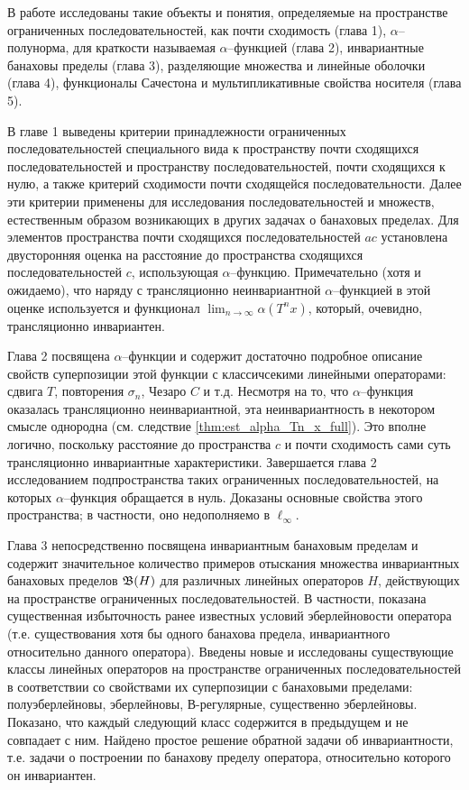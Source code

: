 В работе исследованы такие объекты и понятия, определяемые на пространстве ограниченных последовательностей,
как почти сходимость (глава 1), $\alpha$--полунорма, для краткости называемая $\alpha$--функцией (глава 2),
инвариантные банаховы пределы (глава 3), разделяющие множества и линейные оболочки (глава 4),
функционалы Сачестона и мультипликативные свойства носителя (глава 5).

В главе 1 выведены критерии принадлежности ограниченных последовательностей
специального вида к пространству почти сходящихся последовательностей
и пространству последовательностей, почти сходящихся к нулю,
а также критерий сходимости почти сходящейся последовательности.
Далее эти критерии применены для исследования последовательностей и множеств,
естественным образом возникающих в других задачах о банаховых пределах.
Для элементов пространства почти сходящихся последовательностей $ac $
установлена двусторонняя оценка на расстояние до пространства сходящихся последовательностей $c$,
использующая $\alpha$--функцию.
Примечательно (хотя и ожидаемо), что наряду с трансляционно неинвариантной $\alpha$--функцией
в этой оценке используется и функционал $\lim_{n\to\infty}\alpha(T^n x)$,
который, очевидно, трансляционно инвариантен.

Глава 2 посвящена $\alpha$--функции и содержит достаточно подробное описание
свойств суперпозиции этой функции с классичсекими линейными операторами:
сдвига $T$, повторения $\sigma_n$, Чезаро $C$ и т.д.
Несмотря на то, что $\alpha$--функция оказалась трансляционно неинвариантной,
эта неинвариантность в некотором смысле однородна (см. следствие \ref{thm:est_alpha_Tn_x_full}).
Это вполне логично, поскольку расстояние до пространства $c$ и почти сходимость
сами суть трансляционно инвариантные характеристики.
Завершается глава 2 исследованием подпространства таких ограниченных последовательностей,
на которых $\alpha$--функция обращается в нуль.
Доказаны основные свойства этого пространства;
в частности, оно недополняемо в $\ell_\infty$.

Глава 3 непосредственно посвящена инвариантным банаховым пределам и содержит
значительное количество примеров отыскания множества инвариантных банаховых пределов $\mathfrak{B}(H)$
для различных линейных операторов $H$, действующих на пространстве ограниченных последовательностей.
В частности, показана существенная избыточность ранее известных условий эберлейновости оператора
(т.е. существования хотя бы одного банахова предела, инвариантного относительно данного оператора).
Введены новые и исследованы существующие классы линейных операторов на пространстве ограниченных последовательностей
в соответствии со свойствами их суперпозиции с банаховыми пределами:
полуэберлейновы, эберлейновы, В-регулярные, существенно эберлейновы.
Показано, что каждый следующий класс содержится в предыдущем и не совпадает с ним.
Найдено простое решение обратной задачи об инвариантности,
т.е. задачи о построении по банахову пределу оператора, относительно которого он инвариантен.

